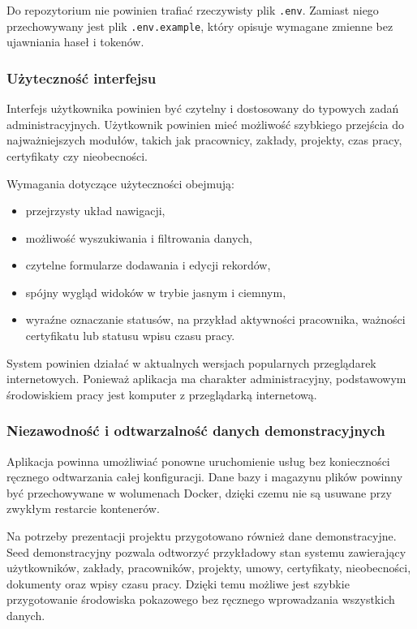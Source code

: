 Do repozytorium nie powinien trafiać rzeczywisty plik \texttt{.env}. Zamiast niego przechowywany jest plik \texttt{.env.example}, który opisuje wymagane zmienne bez ujawniania haseł i tokenów.

\subsubsection{Użyteczność interfejsu}

Interfejs użytkownika powinien być czytelny i dostosowany do typowych zadań administracyjnych. Użytkownik powinien mieć możliwość szybkiego przejścia do najważniejszych modułów, takich jak pracownicy, zakłady, projekty, czas pracy, certyfikaty czy nieobecności.

Wymagania dotyczące użyteczności obejmują:
\begin{itemize}
    \item przejrzysty układ nawigacji,
    \item możliwość wyszukiwania i filtrowania danych,
    \item czytelne formularze dodawania i edycji rekordów,
    \item spójny wygląd widoków w trybie jasnym i ciemnym,
    \item wyraźne oznaczanie statusów, na przykład aktywności pracownika, ważności certyfikatu lub statusu wpisu czasu pracy.
\end{itemize}

System powinien działać w aktualnych wersjach popularnych przeglądarek internetowych. Ponieważ aplikacja ma charakter administracyjny, podstawowym środowiskiem pracy jest komputer z przeglądarką internetową.

\subsubsection{Niezawodność i odtwarzalność danych demonstracyjnych}

Aplikacja powinna umożliwiać ponowne uruchomienie usług bez konieczności ręcznego odtwarzania całej konfiguracji. Dane bazy i magazynu plików powinny być przechowywane w wolumenach Docker, dzięki czemu nie są usuwane przy zwykłym restarcie kontenerów.

Na potrzeby prezentacji projektu przygotowano również dane demonstracyjne. Seed demonstracyjny pozwala odtworzyć przykładowy stan systemu zawierający użytkowników, zakłady, pracowników, projekty, umowy, certyfikaty, nieobecności, dokumenty oraz wpisy czasu pracy. Dzięki temu możliwe jest szybkie przygotowanie środowiska pokazowego bez ręcznego wprowadzania wszystkich danych.